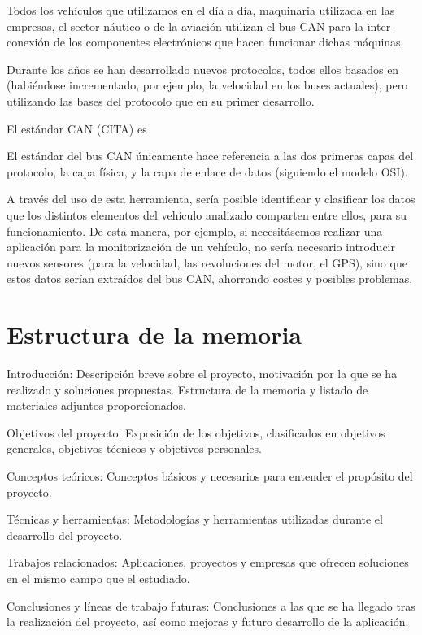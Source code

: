
Todos los vehículos que utilizamos en el día a día, maquinaria utilizada en las empresas, el sector náutico o de la aviación utilizan el bus CAN para la inter-conexión de los componentes electrónicos que hacen funcionar dichas máquinas.

Durante los años se han desarrollado nuevos protocolos, todos ellos basados en  (habiéndose incrementado, por ejemplo, la velocidad en los buses actuales), pero utilizando las bases del protocolo que en su primer desarrollo.

El estándar CAN (CITA) es 

El estándar del bus CAN únicamente hace referencia a las dos primeras capas del protocolo, la capa física, y la capa de enlace de datos (siguiendo el modelo OSI).


A través del uso de esta herramienta, sería posible identificar y clasificar los datos que los distintos elementos del vehículo analizado comparten entre ellos, para su funcionamiento. De esta manera, por ejemplo, si necesitásemos realizar una aplicación para la monitorización de un vehículo, no sería necesario introducir nuevos sensores (para la velocidad, las revoluciones del motor, el GPS), sino que estos datos serían extraídos del bus CAN, ahorrando costes y posibles problemas.

\section{Estructura de la memoria}\label{estructura-de-la-memoria}



Introducción: Descripción breve sobre el proyecto, motivación por la que se ha realizado y soluciones propuestas. Estructura de la memoria y listado de materiales adjuntos proporcionados.

Objetivos del proyecto: Exposición de los objetivos, clasificados en objetivos generales, objetivos técnicos y objetivos personales.

Conceptos teóricos: Conceptos básicos y necesarios para entender el propósito del proyecto. 

Técnicas y herramientas: Metodologías y herramientas utilizadas durante el desarrollo del proyecto.

Trabajos relacionados: Aplicaciones, proyectos y empresas que ofrecen soluciones en el mismo campo que el estudiado.

Conclusiones y líneas de trabajo futuras: Conclusiones a las que se ha llegado tras la realización del proyecto, así como mejoras  y futuro desarrollo de la aplicación.

